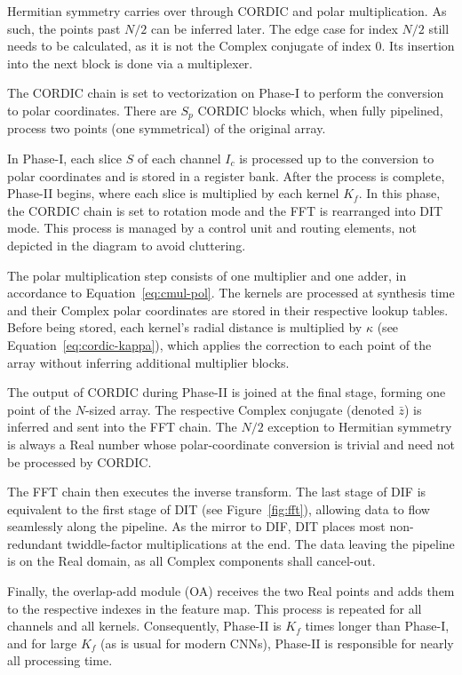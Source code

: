 Hermitian symmetry carries over through CORDIC and polar multiplication. As such, the points past $N/2$ can be inferred later. The edge case for index $N/2$ still needs to be calculated, as it is not the Complex conjugate of index $0$. Its insertion into the next block is done via a multiplexer.

The CORDIC chain is set to vectorization on Phase-I to perform the conversion to polar coordinates. There are $S_p$ CORDIC blocks which, when fully pipelined, process two points (one symmetrical) of the original array.

In Phase-I, each slice $S$ of each channel $I_c$ is processed up to the conversion to polar coordinates and is stored in a register bank. After the process is complete, Phase-II begins, where each slice is multiplied by each kernel $K_f$. In this phase, the CORDIC chain is set to rotation mode and the FFT is rearranged into DIT mode. This process is managed by a control unit and routing elements, not depicted in the diagram to avoid cluttering.

The polar multiplication step consists of one multiplier and one adder, in accordance to Equation~\ref{eq:cmul-pol}. The kernels are processed at synthesis time and their Complex polar coordinates are stored in their respective lookup tables. Before being stored, each kernel's radial distance is multiplied by $\kappa$ (see Equation~\ref{eq:cordic-kappa}), which applies the correction to each point of the array without inferring additional multiplier blocks.

The output of CORDIC during Phase-II is joined at the final stage, forming one point of the $N$-sized array. The respective Complex conjugate (denoted $\bar{z}$) is inferred and sent into the FFT chain. The $N/2$ exception to Hermitian symmetry is always a Real number whose polar-coordinate conversion is trivial and need not be processed by CORDIC.

The FFT chain then executes the inverse transform. The last stage of DIF is equivalent to the first stage of DIT (see Figure~\ref{fig:fft}), allowing data to flow seamlessly along the pipeline. As the mirror to DIF, DIT places most non-redundant twiddle-factor multiplications at the end. The data leaving the pipeline is on the Real domain, as all Complex components shall cancel-out.

Finally, the overlap-add module (OA) receives the two Real points and adds them to the respective indexes in the feature map. This process is repeated for all channels and all kernels. Consequently, Phase-II is $K_f$ times longer than Phase-I, and for large $K_f$ (as is usual for modern CNNs), Phase-II is responsible for nearly all processing time.

